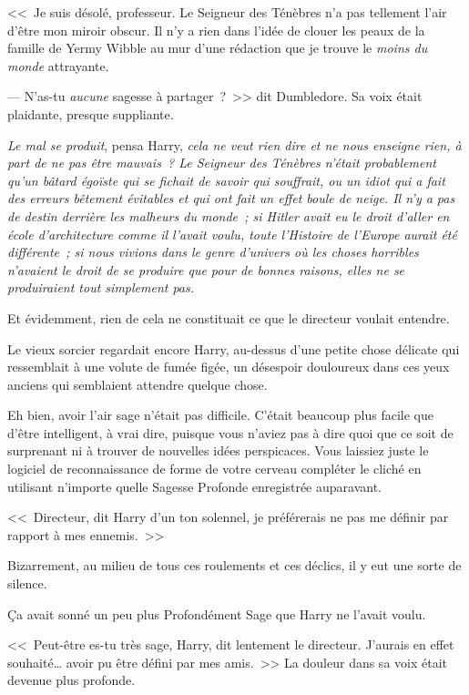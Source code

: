 <<~Je suis désolé, professeur. Le Seigneur des Ténèbres n'a pas tellement l'air d'être mon miroir obscur. Il n'y a rien dans l'idée de clouer les peaux de la famille de Yermy Wibble au mur d'une rédaction que je trouve le \emph{moins du monde} attrayante.

--- N'as-tu \emph{aucune} sagesse à partager~?~>> dit Dumbledore. Sa voix était plaidante, presque suppliante.

\emph{Le mal se produit}, pensa Harry, \emph{cela ne veut rien dire et ne nous enseigne rien, à part de ne pas être mauvais~? Le Seigneur des Ténèbres n'était probablement qu'un bâtard égoïste qui se fichait de savoir qui souffrait, ou un idiot qui a fait des erreurs bêtement évitables et qui ont fait un effet boule de neige. Il n'y a pas de destin derrière les malheurs du monde~; si Hitler avait eu le droit d'aller en école d'architecture comme il l'avait voulu, toute l'Histoire de l'Europe aurait été différente~; si nous vivions dans le genre d'univers où les choses horribles n'avaient le droit de se produire que pour de bonnes raisons, elles ne se produiraient tout simplement pas.}

Et évidemment, rien de cela ne constituait ce que le directeur voulait entendre.

Le vieux sorcier regardait encore Harry, au-dessus d'une petite chose délicate qui ressemblait à une volute de fumée figée, un désespoir douloureux dans ces yeux anciens qui semblaient attendre quelque chose.

Eh bien, avoir l'air sage n'était pas difficile. C'était beaucoup plus facile que d'être intelligent, à vrai dire, puisque vous n'aviez pas à dire quoi que ce soit de surprenant ni à trouver de nouvelles idées perspicaces. Vous laissiez juste le logiciel de reconnaissance de forme de votre cerveau compléter le cliché en utilisant n'importe quelle Sagesse Profonde enregistrée auparavant.

<<~Directeur, dit Harry d'un ton solennel, je préférerais ne pas me définir par rapport à mes ennemis.~>>

Bizarrement, au milieu de tous ces roulements et ces déclics, il y eut une sorte de silence.

Ça avait sonné un peu plus Profondément Sage que Harry ne l'avait voulu.

<<~Peut-être es-tu très sage, Harry, dit lentement le directeur. J'aurais en effet souhaité… avoir pu être défini par mes amis.~>> La douleur dans sa voix était devenue plus profonde.

